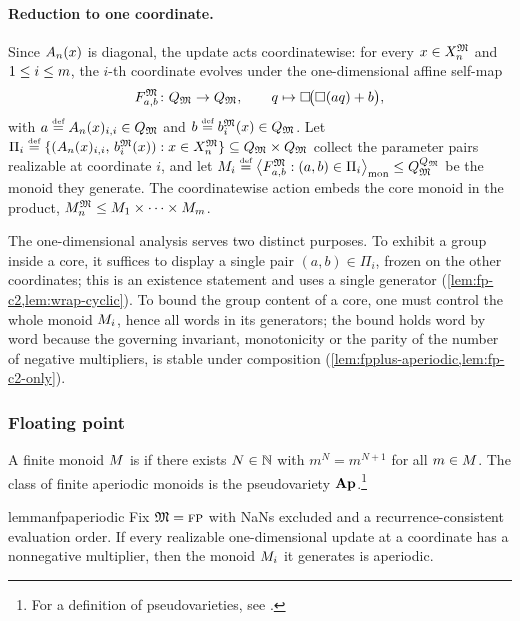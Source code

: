 \documentclass{article}
\begin{document}
\paragraph{Reduction to one coordinate.}
Since $A_n(x)$ is diagonal, the update acts coordinatewise: for every $x \in X_n^{\mathfrak{M}}$ and $1 \le i \le m$, the $i$-th coordinate evolves under the one-dimensional affine self-map
$$
F_{a,b}^{\mathfrak{M}} \colon Q_{\mathfrak{M}} \to Q_{\mathfrak{M}}, \qquad
q \mapsto \square\!\bigl( \square(aq) + b \bigr),
$$
with $a \mathrel{\stackrel{\textnormal{\tiny def}}{=}} A_n(x)_{i,i} \in Q_{\mathfrak{M}}$ and $b \mathrel{\stackrel{\textnormal{\tiny def}}{=}} b_i^{\mathfrak{M}}(x) \in Q_{\mathfrak{M}}$.
Let $\Pi_i \mathrel{\stackrel{\textnormal{\tiny def}}{=}} \{ (A_n(x)_{i,i},\, b_i^{\mathfrak{M}}(x)) : x \in X_n^{\mathfrak{M}} \} \subseteq Q_{\mathfrak{M}} \times Q_{\mathfrak{M}}$ collect the parameter pairs realizable at coordinate $i$, and let $M_i \mathrel{\stackrel{\textnormal{\tiny def}}{=}} \bigl\langle F_{a,b}^{\mathfrak{M}} : (a,b) \in \Pi_i \bigr\rangle_{\mathrm{mon}} \leq Q_{\mathfrak{M}}^{Q_{\mathfrak{M}}}$ be the monoid they generate.
The coordinatewise action embeds the core monoid in the product, $M_n^{\mathfrak{M}} \leq M_1 \times \cdots \times M_m$.

The one-dimensional analysis serves two distinct purposes.
To exhibit a group inside a core, it suffices to display a single pair $(a,b) \in \Pi_i$, frozen on the other coordinates; this is an existence statement and uses a single generator (\cref{lem:fp-c2,lem:wrap-cyclic}).
To bound the group content of a core, one must control the whole monoid $M_i$, hence all words in its generators; the bound holds word by word because the governing invariant, monotonicity or the parity of the number of negative multipliers, is stable under composition (\cref{lem:fpplus-aperiodic,lem:fp-c2-only}).

\subsubsection{Floating point}

\begin{definition}\label{def:aperiodic}
A finite monoid $M$ is  if there exists $N \in \mathbb{N}$ with $m^N = m^{N+1}$ for all $m \in M$.
The class of finite aperiodic monoids is the pseudovariety $\mathbf{Ap}$.\footnote{For a definition of pseudovarieties, see \citet{eilenberg1976pseudovarieties}.}
\end{definition}

\begin{restatable}{lemma}{nfpaperiodic}\label{lem:fpplus-aperiodic}
Fix $\mathfrak{M} = \textsc{fp}$ with NaNs excluded and a recurrence-consistent evaluation order.
If every realizable one-dimensional update at a coordinate has a nonnegative multiplier, then the monoid $M_i$ it generates is aperiodic.
\end{restatable}
\end{document}
